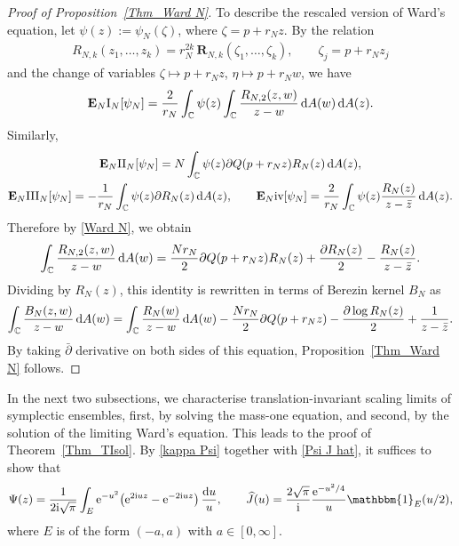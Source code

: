 \documentclass[pdftex]{sigma}
\numberwithin{equation}{section}
\newcommand{\bfR}{\mathbf{R}}
\newcommand{\I}{{\mathrm{I}}}
\newcommand{\II}{{\mathrm{II}}}
\newcommand{\III}{{\mathrm{III}}}
\newcommand{\C}{{\mathbb C}}
\newcommand{\E}{{\mathbf E}}
\newcommand{\1}{\chi}
\def\wh{\widehat}
\newcommand{\RN}[1]{%
	\textup{\uppercase\expandafter{\romannumeral#1}}%
}
\begin{document}
\begin{proof}[Proof of Proposition~\ref{Thm_Ward N}]
	To describe the rescaled version of Ward's equation, let $\psi(z):=\psi_N(\zeta)$, where $\zeta=p+ r_N z.$ By the relation
	\begin{gather*}
		R_{N,k}(z_1,\dots,z_k)=r_N^{2k} \, \bfR_{N,k}(\zeta_1,\dots, \zeta_k), \qquad \zeta_j=p+ r_N z_j
	\end{gather*}
	and the change of variables $\zeta \mapsto p+ r_N z$, $\eta \mapsto p+ r_N w$, we have
	\begin{gather*}
		\E_N \I_N[\psi_N]=\frac{2}{r_N} \int_{ \C } \psi(z) \int_{ \C } \frac{ R_{N,2}(z,w)}{z-w} \,{\rm d}A(w) \,{\rm d}A(z).
	\end{gather*}
	Similarly,
	\begin{gather*}
		\E_N \II_N[\psi_N]
		=N \int_{ \C } \psi (z) \partial Q(p+ r_N z) R_{N}(z) \,{\rm d}A(z),
		\\
		\E_N \III_N[\psi_N]=-\frac{1}{r_N}\int_{ \C } \psi(z) \partial R_{N}(z) \,{\rm d}A(z), \qquad \E_N \RN{4}[\psi_N]= \frac{2}{r_N} \int_{ \C } \psi(z) \frac{ R_{N}(z) }{ z-\bar{z} } \,{\rm d}A(z).
	\end{gather*}	
	Therefore by \eqref{Ward N}, we obtain
	\begin{gather*}
	\int_{ \C } \frac{ R_{N,2}(z,w)}{z-w} \,{\rm d}A(w)
	= \frac{Nr_N}{2} \partial Q(p+r_Nz) R_{N}(z)+\frac{\partial R_N(z)}{2} -\frac{ R_{N}(z) }{ z-\bar{z} }.
	\end{gather*}
	Dividing by $R_N(z)$, this identity is rewritten in terms of Berezin kernel $B_N$ as
	\begin{gather*}
	\int_{ \C } \frac{ B_N(z,w) }{z-w} \,{\rm d}A(w)=\int_{ \C } \frac{R_N(w)}{z-w} \,{\rm d}A(w)
	-\frac{Nr_N}{2} \partial Q(p+r_Nz)
	-\frac{ \partial \log R_N(z)}{2} + \frac{ 1 }{ z-\bar{z} }.
	\end{gather*}
	By taking $\bar{\partial}$ derivative on both sides of this equation, Proposition~\ref{Thm_Ward N} follows.	
\end{proof}

In the next two subsections, we characterise translation-invariant scaling limits of symplectic ensembles, first, by solving the mass-one equation, and second, by the solution of the limiting Ward's equation. This leads to the proof of Theorem~\ref{Thm_TIsol}. By \eqref{kappa Psi} together with \eqref{Psi J hat}, it suffices to show that
\begin{gather}\label{Psi}
	\Psi(z)
	=\frac{1}{2{\rm i}\sqrt{\pi}} \int_E {\rm e}^{-u^2}\big({\rm e}^{ 2{\rm i}uz }-{\rm e}^{ -2{\rm i}uz } \big) \, \frac{{\rm d}u}{u}, \qquad 	\wh{J}(u)
	=\frac{2\sqrt{\pi}}{{\rm i}} \frac{{\rm e}^{-u^2/4}}{u}\mathbbm{1}_{E}(u/2),
\end{gather}
where $E$ is of the form $(-a,a)$ with $a \in [0,\infty]$.
\end{document}
